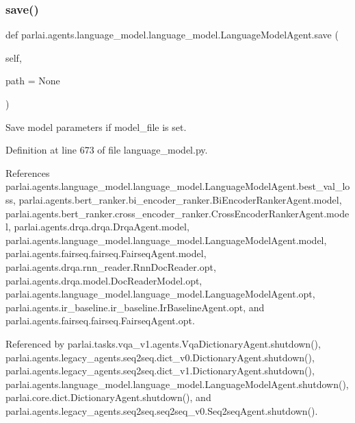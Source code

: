 \subsubsection{\texorpdfstring{save()}{save()}}
{\footnotesize\ttfamily def parlai.\+agents.\+language\+\_\+model.\+language\+\_\+model.\+Language\+Model\+Agent.\+save (\begin{DoxyParamCaption}\item[{}]{self,  }\item[{}]{path = {\ttfamily None} }\end{DoxyParamCaption})}

\begin{DoxyVerb}Save model parameters if model_file is set.\end{DoxyVerb}
 

Definition at line 673 of file language\+\_\+model.\+py.



References parlai.\+agents.\+language\+\_\+model.\+language\+\_\+model.\+Language\+Model\+Agent.\+best\+\_\+val\+\_\+loss, parlai.\+agents.\+bert\+\_\+ranker.\+bi\+\_\+encoder\+\_\+ranker.\+Bi\+Encoder\+Ranker\+Agent.\+model, parlai.\+agents.\+bert\+\_\+ranker.\+cross\+\_\+encoder\+\_\+ranker.\+Cross\+Encoder\+Ranker\+Agent.\+model, parlai.\+agents.\+drqa.\+drqa.\+Drqa\+Agent.\+model, parlai.\+agents.\+language\+\_\+model.\+language\+\_\+model.\+Language\+Model\+Agent.\+model, parlai.\+agents.\+fairseq.\+fairseq.\+Fairseq\+Agent.\+model, parlai.\+agents.\+drqa.\+rnn\+\_\+reader.\+Rnn\+Doc\+Reader.\+opt, parlai.\+agents.\+drqa.\+model.\+Doc\+Reader\+Model.\+opt, parlai.\+agents.\+language\+\_\+model.\+language\+\_\+model.\+Language\+Model\+Agent.\+opt, parlai.\+agents.\+ir\+\_\+baseline.\+ir\+\_\+baseline.\+Ir\+Baseline\+Agent.\+opt, and parlai.\+agents.\+fairseq.\+fairseq.\+Fairseq\+Agent.\+opt.



Referenced by parlai.\+tasks.\+vqa\+\_\+v1.\+agents.\+Vqa\+Dictionary\+Agent.\+shutdown(), parlai.\+agents.\+legacy\+\_\+agents.\+seq2seq.\+dict\+\_\+v0.\+Dictionary\+Agent.\+shutdown(), parlai.\+agents.\+legacy\+\_\+agents.\+seq2seq.\+dict\+\_\+v1.\+Dictionary\+Agent.\+shutdown(), parlai.\+agents.\+language\+\_\+model.\+language\+\_\+model.\+Language\+Model\+Agent.\+shutdown(), parlai.\+core.\+dict.\+Dictionary\+Agent.\+shutdown(), and parlai.\+agents.\+legacy\+\_\+agents.\+seq2seq.\+seq2seq\+\_\+v0.\+Seq2seq\+Agent.\+shutdown().


